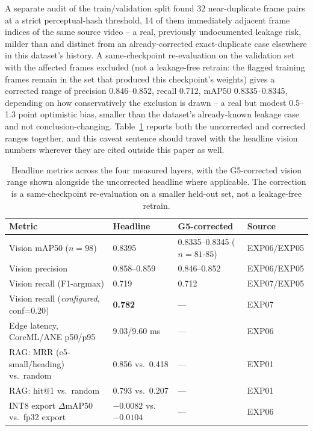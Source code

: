 A separate audit of the train/validation split found 32 near-duplicate frame pairs at a strict
perceptual-hash threshold, 14 of them immediately adjacent frame indices of the same source video
-- a real, previously undocumented leakage risk, milder than and distinct from an already-corrected
exact-duplicate case elsewhere in this dataset's history. A same-checkpoint re-evaluation on the
validation set with the affected frames excluded (not a leakage-free retrain: the flagged training
frames remain in the set that produced this checkpoint's weights) gives a corrected range of precision
0.846--0.852, recall 0.712, mAP50 0.8335--0.8345, depending on how conservatively the exclusion is
drawn -- a real but modest 0.5--1.3 point optimistic bias, smaller than the dataset's already-known
leakage case and not conclusion-changing. Table~\ref{tab:headline-metrics} reports both the
uncorrected and corrected ranges together, and this caveat sentence should travel with the headline
vision numbers wherever they are cited outside this paper as well.

\begin{table}[t]
\centering
\small
\caption{Headline metrics across the four measured layers, with the G5-corrected vision range
shown alongside the uncorrected headline where applicable. The correction is a same-checkpoint
re-evaluation on a smaller held-out set, not a leakage-free retrain.}
\label{tab:headline-metrics}
\begin{tabular}{@{}p{5.4cm}p{3.0cm}p{3.0cm}l@{}}
\toprule
Metric & Headline & G5-corrected & Source \\
\midrule
Vision mAP50 ($n{=}98$) & 0.8395 & 0.8335--0.8345 ($n{=}81\text{-}85$) & EXP06/EXP05 \\
Vision precision & 0.858--0.859 & 0.846--0.852 & EXP06/EXP05 \\
Vision recall (F1-argmax) & 0.719 & 0.712 & EXP07/EXP05 \\
Vision recall (\emph{configured}, conf=0.20) & \textbf{0.782} & --- & EXP07 \\
Edge latency, CoreML/ANE p50/p95 & 9.03/9.60 ms & --- & EXP06 \\
RAG: MRR (e5-small/heading) vs.\ random & 0.856 vs.\ 0.418 & --- & EXP01 \\
RAG: hit@1 vs.\ random & 0.793 vs.\ 0.207 & --- & EXP01 \\
INT8 export $\Delta$mAP50 vs.\ fp32 export & $-0.0082$ vs.\ $-0.0104$ & --- & EXP06 \\
\bottomrule
\end{tabular}
\end{table}


